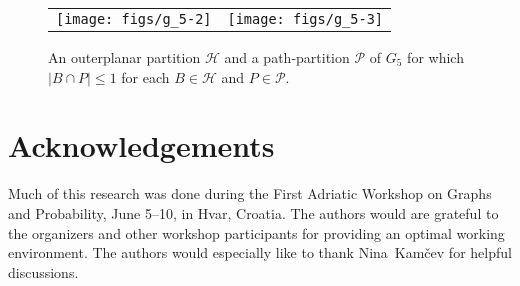 \documentclass{patmorin}
\renewcommand{\le}{\leqslant}
\begin{document}
\begin{figure}
  \begin{center}
    \begin{tabular}{cc}
      \texttt{[image: figs/g\_5-2]} & \texttt{[image: figs/g\_5-3]}
    \end{tabular}
  \end{center}
  \caption{An outerplanar partition $\mathcal{H}$ and a path-partition $\mathcal{P}$ of $G_5$ for which $|B\cap P|\le 1$ for each $B\in\mathcal{H}$ and $P\in\mathcal{P}$.}
  \label{two_tree}
\end{figure}

\section*{Acknowledgements}

Much of this research was done during the First Adriatic Workshop on Graphs and Probability, June 5--10, in Hvar, Croatia.  The authors would are grateful to the organizers and other workshop participants for providing an optimal working environment.  The authors would especially like to thank Nina~Kamčev for helpful discussions.





\end{document}
